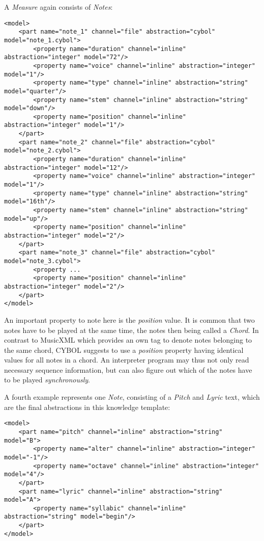 A \emph{Measure} again consists of \emph{Notes}:

\begin{scriptsize}
    \begin{verbatim}
<model>
    <part name="note_1" channel="file" abstraction="cybol" model="note_1.cybol">
        <property name="duration" channel="inline" abstraction="integer" model="72"/>
        <property name="voice" channel="inline" abstraction="integer" model="1"/>
        <property name="type" channel="inline" abstraction="string" model="quarter"/>
        <property name="stem" channel="inline" abstraction="string" model="down"/>
        <property name="position" channel="inline" abstraction="integer" model="1"/>
    </part>
    <part name="note_2" channel="file" abstraction="cybol" model="note_2.cybol">
        <property name="duration" channel="inline" abstraction="integer" model="12"/>
        <property name="voice" channel="inline" abstraction="integer" model="1"/>
        <property name="type" channel="inline" abstraction="string" model="16th"/>
        <property name="stem" channel="inline" abstraction="string" model="up"/>
        <property name="position" channel="inline" abstraction="integer" model="2"/>
    </part>
    <part name="note_3" channel="file" abstraction="cybol" model="note_3.cybol">
        <property ...
        <property name="position" channel="inline" abstraction="integer" model="2"/>
    </part>
</model>
    \end{verbatim}
\end{scriptsize}

An important property to note here is the \emph{position} value. It is common
that two notes have to be played at the same time, the notes then being called
a \emph{Chord}. In contrast to MusicXML which provides an own tag to denote
notes belonging to the same chord, CYBOL suggests to use a \emph{position}
property having identical values for all notes in a chord. An interpreter
program may thus not only read necessary sequence information, but can also
figure out which of the notes have to be played \emph{synchronously}.

A fourth example represents one \emph{Note}, consisting of a \emph{Pitch} and
\emph{Lyric} text, which are the final abstractions in this knowledge template:

\begin{scriptsize}
    \begin{verbatim}
<model>
    <part name="pitch" channel="inline" abstraction="string" model="B">
        <property name="alter" channel="inline" abstraction="integer" model="-1"/>
        <property name="octave" channel="inline" abstraction="integer" model="4"/>
    </part>
    <part name="lyric" channel="inline" abstraction="string" model="A">
        <property name="syllabic" channel="inline" abstraction="string" model="begin"/>
    </part>
</model>
    \end{verbatim}
\end{scriptsize}
